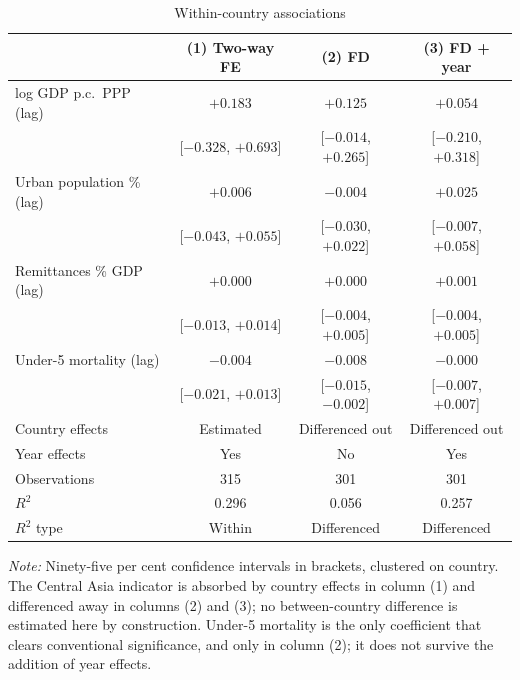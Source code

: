 \begin{table}[htbp]
\centering
\caption{Within-country associations}
\label{tab:layerB}
\small
\begin{tabular}{lccc}
\toprule
 & (1) Two-way FE & (2) FD & (3) FD + year \\
\midrule
log GDP p.c.\ PPP (lag)   & $+0.183$ & $+0.125$ & $+0.054$ \\
                          & [$-0.328$, $+0.693$] & [$-0.014$, $+0.265$] & [$-0.210$, $+0.318$] \\
Urban population \% (lag) & $+0.006$ & $-0.004$ & $+0.025$ \\
                          & [$-0.043$, $+0.055$] & [$-0.030$, $+0.022$] & [$-0.007$, $+0.058$] \\
Remittances \% GDP (lag)  & $+0.000$ & $+0.000$ & $+0.001$ \\
                          & [$-0.013$, $+0.014$] & [$-0.004$, $+0.005$] & [$-0.004$, $+0.005$] \\
Under-5 mortality (lag)   & $-0.004$ & $-0.008$ & $-0.000$ \\
                          & [$-0.021$, $+0.013$] & [$-0.015$, $-0.002$] & [$-0.007$, $+0.007$] \\
\midrule
Country effects           & Estimated & Differenced out & Differenced out \\
Year effects              & Yes & No & Yes \\
Observations              & 315 & 301 & 301 \\
$R^2$                     & 0.296 & 0.056 & 0.257 \\
$R^2$ type                & Within & Differenced & Differenced \\
\bottomrule
\end{tabular}

\begin{minipage}{\textwidth}\footnotesize
\vspace{4pt}
\emph{Note:} Ninety-five per cent confidence intervals in brackets, clustered on country.
The Central Asia indicator is absorbed by country effects in column (1) and differenced
away in columns (2) and (3); no between-country difference is estimated here by
construction. Under-5 mortality is the only coefficient that clears conventional
significance, and only in column (2); it does not survive the addition of year effects.
\end{minipage}
\end{table}
